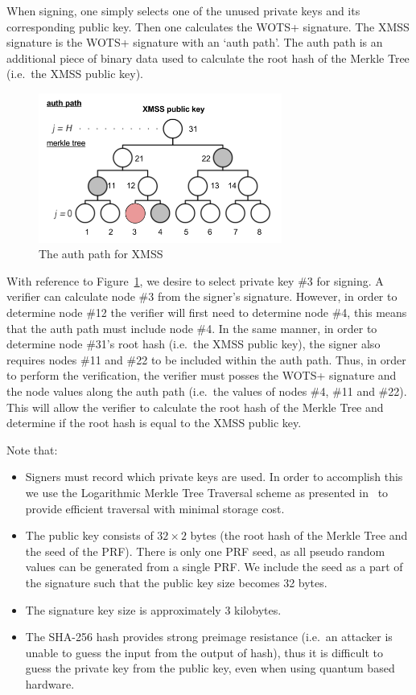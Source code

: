 \documentclass[a4paper,10pt,twocolumn]{article}
\begin{document}
When signing, one simply selects one of the unused private keys and its corresponding public key. Then one calculates the WOTS+ signature. The 
XMSS signature is the WOTS+ signature with an `auth path'. The auth path is an additional piece of binary data used to calculate the 
root hash of the Merkle Tree (i.e.\ the XMSS public key).

\begin{figure}[ht]
	\begin{center}
	\includegraphics[width=80mm]{auth_path.png}
	  \caption{The auth path for XMSS}
    \label{fig:xmss_auth}
	\end{center}
 \end{figure}

With reference to Figure~\ref{fig:xmss_auth}, we desire to select private key \#3 for signing. A verifier can calculate node \#3 from the 
signer's signature. However, in order to determine node \#12 the verifier will first need to determine node \#4, this means that the auth 
path must include node \#4. In the same manner, in order to determine node \#31's root hash (i.e.\ the XMSS public key), the signer also 
requires nodes \#11 and \#22 to be included within the auth path. Thus, in order to perform the verification, the verifier must posses the 
WOTS+ signature and the node values along the auth path (i.e.\ the values of nodes \#4, \#11 and \#22). This will allow the verifier to 
calculate the root hash of the Merkle Tree and determine if the root hash is equal to the XMSS public key.

Note that:
\vspace{-0.5\baselineskip}
\begin{itemize}
	\setlength\itemsep{0em}
	\item Signers must record which private keys are used. In order to accomplish this we use the Logarithmic Merkle Tree Traversal 
	scheme as presented in~\cite{traverse} to provide efficient traversal with minimal storage cost. \item The public key consists of 
	\(32 \times 2 \) bytes (the root hash of the Merkle Tree and the seed of the PRF). There is only one PRF seed, as all pseudo random 
	values can be generated from a single PRF\@. We include the seed as a part of the signature such that the public key size becomes 
	32 bytes. \item  The signature key size is approximately 3 kilobytes. \item The SHA-256 hash provides strong preimage resistance 
	(i.e.\ an attacker is unable to guess the input from the output of hash), thus it is difficult to guess the private key from the public key, even when using quantum based hardware.
\end{itemize}
		
\end{document}
